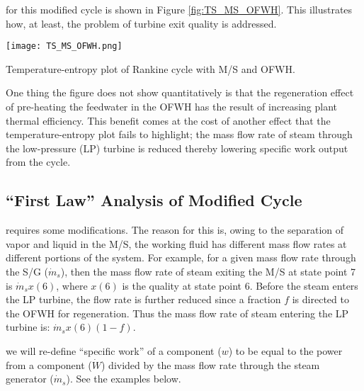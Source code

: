  for this modified cycle is shown in Figure \ref{fig:TS_MS_OFWH}.  This illustrates how, at least, the problem of turbine exit quality is addressed.
\begin{marginfigure}
\texttt{[image: TS\_MS\_OFWH.png]}
\caption{Temperature-entropy plot of Rankine cycle with M/S and OFWH.}
\label{fig:TS_MS_OFWH}
\end{marginfigure}
One thing the figure does not show quantitatively is that the regeneration effect of pre-heating the feedwater in the OFWH has the result of increasing plant thermal efficiency.  This benefit comes at the cost of another effect that the temperature-entropy plot fails to highlight; the mass flow rate of steam through the low-pressure (LP) turbine is reduced thereby lowering specific work output from the cycle.

\subsection{``First Law'' Analysis of Modified Cycle}

 requires some modifications.  The reason for this is, owing to the separation of vapor and liquid in the M/S, the working fluid has different mass flow rates at different portions of the system.  For example, for a given mass flow rate through the S/G ($\dot{m}_{s}$), then the mass flow rate of steam exiting the M/S at state point 7 is $\dot{m}_s x(6)$, where $x(6)$ is the quality at state point 6. Before the steam enters the LP turbine, the flow rate is further reduced since a fraction $f$ is directed to the OFWH for regeneration.  Thus the mass flow rate of steam entering the LP turbine is: $\dot{m}_s x(6)(1-f)$.

 we will re-define ``specific work'' of a component ($w$) to be equal to the power from a component ($\dot{W}$) divided by the mass flow rate through the steam generator ($\dot{m}_s$).  See the examples below.


